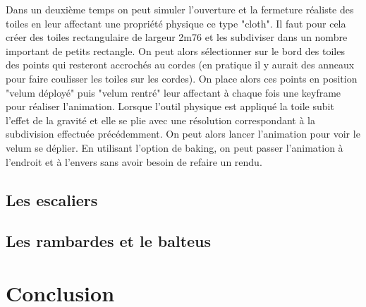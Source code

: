 Dans un deuxième temps on peut simuler l'ouverture et la fermeture réaliste des toiles en leur affectant une propriété physique ce type "cloth". Il faut pour cela créer des toiles rectangulaire de largeur 2m76 et les subdiviser dans un nombre important de petits rectangle. On peut alors sélectionner sur le bord des toiles des points qui resteront accrochés au cordes (en pratique il y aurait des anneaux pour faire coulisser les toiles sur les cordes). On place alors ces points en position "velum déployé" puis "velum rentré" leur affectant à chaque fois une \gls{keyframe} pour réaliser l'animation. Lorsque l'outil physique est appliqué la toile subit l'effet de la gravité et elle se plie avec une résolution correspondant à la subdivision effectuée précédemment. On peut alors lancer l'animation pour voir le velum se déplier. En utilisant l'option de \gls{baking}, on peut passer l'animation à l'endroit et à l'envers sans avoir besoin de refaire un rendu.



\section{Les escaliers} 

\section{Les rambardes et le \gls{balteus}} 
		
	\chapter*{Conclusion}
		\newpage
			
 
 


